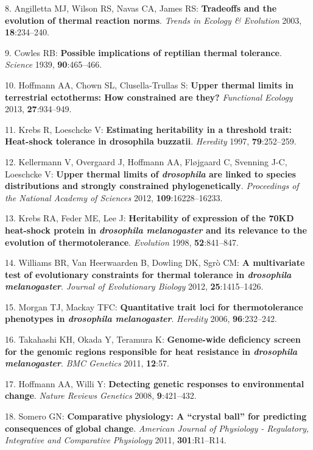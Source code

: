 \documentclass[]{article}
\begin{document}
8. Angilletta MJ, Wilson RS, Navas CA, James RS: \textbf{Tradeoffs and
the evolution of thermal reaction norms}. \emph{Trends in Ecology \&
Evolution} 2003, \textbf{18}:234--240.

9. Cowles RB: \textbf{Possible implications of reptilian thermal
tolerance}. \emph{Science} 1939, \textbf{90}:465--466.

10. Hoffmann AA, Chown SL, Clusella-Trullas S: \textbf{Upper thermal
limits in terrestrial ectotherms: How constrained are they?}
\emph{Functional Ecology} 2013, \textbf{27}:934--949.

11. Krebs R, Loeschcke V: \textbf{Estimating heritability in a threshold
trait: Heat-shock tolerance in drosophila buzzatii}. \emph{Heredity}
1997, \textbf{79}:252--259.

12. Kellermann V, Overgaard J, Hoffmann AA, Fl{ø}jgaard C, Svenning J-C,
Loeschcke V: \textbf{Upper thermal limits of \emph{drosophila} are
linked to species distributions and strongly constrained
phylogenetically}. \emph{Proceedings of the National Academy of
Sciences} 2012, \textbf{109}:16228--16233.

13. Krebs RA, Feder ME, Lee J: \textbf{Heritability of expression of the
70KD heat-shock protein in \emph{drosophila melanogaster} and its
relevance to the evolution of thermotolerance}. \emph{Evolution} 1998,
\textbf{52}:841--847.

14. Williams BR, Van Heerwaarden B, Dowling DK, Sgr{ò} CM: \textbf{A
multivariate test of evolutionary constraints for thermal tolerance in
\emph{drosophila melanogaster}}. \emph{Journal of Evolutionary Biology}
2012, \textbf{25}:1415--1426.

15. Morgan TJ, Mackay TFC: \textbf{Quantitative trait loci for
thermotolerance phenotypes in \emph{drosophila melanogaster}}.
\emph{Heredity} 2006, \textbf{96}:232--242.

16. Takahashi KH, Okada Y, Teramura K: \textbf{Genome-wide deficiency
screen for the genomic regions responsible for heat resistance in
\emph{drosophila melanogaster}}. \emph{BMC Genetics} 2011,
\textbf{12}:57.

17. Hoffmann AA, Willi Y: \textbf{Detecting genetic responses to
environmental change}. \emph{Nature Reviews Genetics} 2008,
\textbf{9}:421--432.

18. Somero GN: \textbf{Comparative physiology: A ``crystal ball'' for
predicting consequences of global change}. \emph{American Journal of
Physiology - Regulatory, Integrative and Comparative Physiology} 2011,
\textbf{301}:R1--R14.
\end{document}
